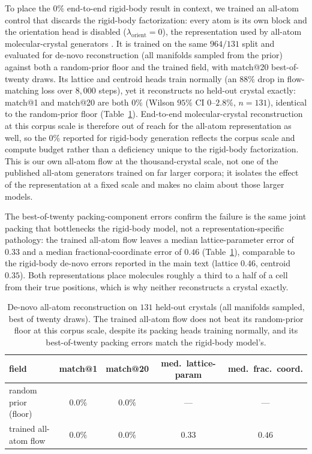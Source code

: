 \documentclass[10pt]{article}
\begin{document}
To place the $0\%$ end-to-end rigid-body result in context, we trained an
all-atom control that discards the rigid-body factorization: every atom is its own
block and the orientation head is disabled ($\lambda_{\text{orient}}=0$), the
representation used by all-atom molecular-crystal
generators \citep{jin2025oxtal,subramanian2026packflow}. It is trained on the same
$964/131$ split and evaluated for de-novo reconstruction (all manifolds sampled
from the prior) against both a random-prior floor and the trained field, with
match@20 best-of-twenty draws. Its lattice and centroid heads train normally (an
$88\%$ drop in flow-matching loss over $8{,}000$ steps), yet it reconstructs no
held-out crystal exactly: match@1 and match@20 are both $0\%$ (Wilson $95\%$ CI
$0$--$2.8\%$, $n=131$), identical to the random-prior floor
(Table~\ref{tab:allatom}). End-to-end molecular-crystal reconstruction at this
corpus scale is therefore out of reach for the all-atom representation as well, so
the $0\%$ reported for rigid-body generation reflects the corpus scale and compute
budget rather than a deficiency unique to the rigid-body factorization. This is
our own all-atom flow at the thousand-crystal scale, not one of the published
all-atom generators \citep{jin2025oxtal,subramanian2026packflow} trained on far
larger corpora; it isolates the effect of the representation at a fixed scale and
makes no claim about those larger models.

The best-of-twenty packing-component errors confirm the failure is the same joint
packing that bottlenecks the rigid-body model, not a representation-specific
pathology: the trained all-atom flow leaves a median lattice-parameter error of
$0.33$ and a median fractional-coordinate error of $0.46$ (Table~\ref{tab:allatom}),
comparable to the rigid-body de-novo errors reported in the main text (lattice
$0.46$, centroid $0.35$). Both representations place molecules roughly a third to a
half of a cell from their true positions, which is why neither reconstructs a
crystal exactly.

\begin{table}[h]
\centering
\caption{De-novo all-atom reconstruction on $131$ held-out crystals (all manifolds
sampled, best of twenty draws). The trained all-atom flow does not beat its
random-prior floor at this corpus scale, despite its packing heads training
normally, and its best-of-twenty packing errors match the rigid-body model's.}
\label{tab:allatom}
\begin{tabular}{lcccc}
\toprule
field & match@1 & match@20 & med.\ lattice-param & med.\ frac.\ coord. \\
\midrule
random prior (floor)   & $0.0\%$ & $0.0\%$ & --- & --- \\
trained all-atom flow  & $0.0\%$ & $0.0\%$ & $0.33$ & $0.46$ \\
\bottomrule
\end{tabular}
\end{table}
\end{document}
